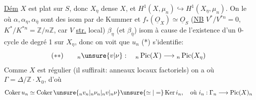 \uline{Dém} $X$ est plat sur $S$, donc $X_\eta$ dense  $X$, et $H^1(X,\mu_n)\hookrightarrow H^1(X_\eta,\mu_n)$. On  le 
où $\alpha,\alpha_\eta,\alpha_{\bar\eta}$ sont des isom par  de Kummer et $f_*(\underline O_X)\simeq\underline O_S$ (\uline{NB} $V^*/V^{*n}=0$, $K^*/K^{*n}=\mathbb Z/n\mathbb Z$, car $V$ \uline{str.} local) $\beta_\eta$ (et $\beta_{\bar\eta}$)  isom à cause de l'existence d'un 0-cycle de degré 1 sur $X_\eta$, donc on voit que $u_n$  (*) s'identifie:
\[
(**)\qquad{}_n\unsure{v|\nu}:\quad{}_n\operatorname{Pic}(X)\longrightarrow{}_n\operatorname{Pic}(X_\eta)
\]
Comme $X$ est régulier (il suffirait: anneaux locaux factoriels) on a
où $\Gamma=\Delta/\mathbb Z\cdot X_0$, d'où
\[
\operatorname{Coker}u_n\simeq\operatorname{Coker}\unsure{{}_nv_n|{}_n\nu_n|{}_nv|{}_n\nu}\unsure{\simeq|=}\operatorname{Ker}i_n,\quad\text{où }i_n:\Gamma_n\longrightarrow\operatorname{Pic}(X)_n
\]

